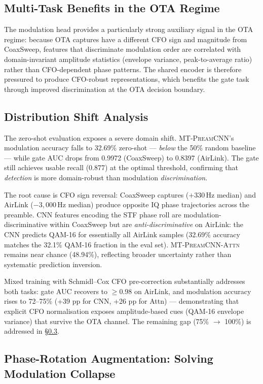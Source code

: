 \documentclass[conference]{IEEEtran}
\newcommand{\mtcnn}{\textsc{MT-PreamCNN}}
\newcommand{\mtcnnattn}{\textsc{MT-PreamCNN-Attn}}
\begin{document}
\subsection{Multi-Task Benefits in the OTA Regime}
\label{sec:mt_ota}

The modulation head provides a particularly strong auxiliary signal
in the OTA regime: because OTA captures have a different CFO sign
and magnitude from CoaxSweep, features that discriminate modulation
order are correlated with domain-invariant amplitude statistics
(envelope variance, peak-to-average ratio) rather than CFO-dependent
phase patterns.
The shared encoder is therefore pressured to produce
CFO-robust representations, which benefits the gate task through
improved discrimination at the OTA decision boundary.

\subsection{Distribution Shift Analysis}
\label{sec:shift}

The zero-shot evaluation exposes a severe domain shift.
\mtcnn{}'s modulation accuracy falls to 32.69\% zero-shot —
\emph{below} the 50\% random baseline — while gate AUC
drops from 0.9972 (CoaxSweep) to 0.8397 (AirLink).
The gate still achieves usable recall (0.877)
at the optimal threshold, confirming that
\emph{detection} is more domain-robust than modulation
\emph{discrimination}.

The root cause is CFO sign reversal: CoaxSweep captures ($+330$\,Hz
median) and AirLink ($-3{,}000$\,Hz median) produce opposite
IQ phase trajectories across the preamble.
CNN features encoding the STF phase roll are modulation-discriminative
within CoaxSweep but are \emph{anti-discriminative} on AirLink:
the CNN predicts QAM-16 for essentially all AirLink samples
(32.69\% accuracy matches the 32.1\% QAM-16 fraction in the eval set).
\mtcnnattn{} remains near chance (48.94\%), reflecting broader
uncertainty rather than systematic prediction inversion.

Mixed training with Schmidl--Cox CFO pre-correction substantially
addresses both tasks: gate AUC recovers to $\ge$0.98 on AirLink,
and modulation accuracy rises to 72--75\% (+39 pp for CNN, +26 pp
for Attn) — demonstrating that explicit CFO normalisation exposes
amplitude-based cues (QAM-16 envelope variance) that survive the
OTA channel.
The remaining gap (75\% $\to$ 100\%) is addressed in \S\ref{sec:phaseaug}.

\subsection{Phase-Rotation Augmentation: Solving Modulation Collapse}
\label{sec:phaseaug}
\end{document}
